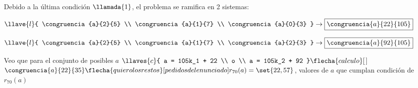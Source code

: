 Debido a la última condición $\llamada{1}$, el problema se ramifica en 2 sistemas:\\
\begin{minipage}{0.5\textwidth}
	\centering
	$
		\llave{l}{
			\congruencia{a}{2}{5} \\
			\congruencia{a}{1}{7} \\
			\congruencia{a}{0}{3}
		}
		\to \boxed{\congruencia{a}{22}{105} }
	$
\end{minipage}
\begin{minipage}{0.5\textwidth}
	\centering
	$\llave{l}{
			\congruencia{a}{2}{5} \\
			\congruencia{a}{1}{7} \\
			\congruencia{a}{2}{3}
		}
		\to \boxed{\congruencia{a}{92}{105} }
	$
\end{minipage}
Veo que para el conjunto de posibles $a$
$\llaves{c}{
		a = 105k_1 + 22 \\
		o \\
		a = 105k_2 + 92
	}\flecha{calculo}[$$]$
$\congruencia{a}{22}{35} \flecha{quiero los restos}[pedidos del enunciado] r_{70}(a) = \set{22, 57}$,
valores de $a$ que cumplan condición de $r_{70}(a)$
